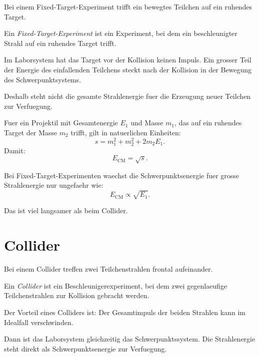 Bei einem Fixed-Target-Experiment trifft ein bewegtes Teilchen auf ein ruhendes
Target.

\begin{definitionbox}
Ein \emph{Fixed-Target-Experiment} ist ein Experiment, bei dem ein beschleunigter
Strahl auf ein ruhendes Target trifft.
\end{definitionbox}

\begin{conceptbox}
Im Laborsystem hat das Target vor der Kollision keinen Impuls.
Ein grosser Teil der Energie des einfallenden Teilchens steckt nach der Kollision
in der Bewegung des Schwerpunktsystems.

Deshalb steht nicht die gesamte Strahlenergie fuer die Erzeugung neuer Teilchen zur
Verfuegung.
\end{conceptbox}

\begin{formulabox}
Fuer ein Projektil mit Gesamtenergie $E_1$ und Masse $m_1$, das auf ein ruhendes
Target der Masse $m_2$ trifft, gilt in natuerlichen Einheiten:
\[
    s
    =
    m_1^2
    +
    m_2^2
    +
    2m_2E_1.
\]
Damit:
\[
    E_{\mathrm{CM}}
    =
    \sqrt{s}.
\]
\end{formulabox}

\begin{examtipbox}
Bei Fixed-Target-Experimenten waechst die Schwerpunktsenergie fuer grosse
Strahlenergie nur ungefaehr wie:
\[
    E_{\mathrm{CM}}\propto \sqrt{E_1}.
\]

Das ist viel langsamer als beim Collider.
\end{examtipbox}

\section{Collider}

Bei einem Collider treffen zwei Teilchenstrahlen frontal aufeinander.

\begin{definitionbox}
Ein \emph{Collider} ist ein Beschleunigerexperiment, bei dem zwei gegenlaeufige
Teilchenstrahlen zur Kollision gebracht werden.
\end{definitionbox}

\begin{conceptbox}
Der Vorteil eines Colliders ist:
Der Gesamtimpuls der beiden Strahlen kann im Idealfall verschwinden.

Dann ist das Laborsystem gleichzeitig das Schwerpunktssystem.
Die Strahlenergie steht direkt als Schwerpunktsenergie zur Verfuegung.
\end{conceptbox}

